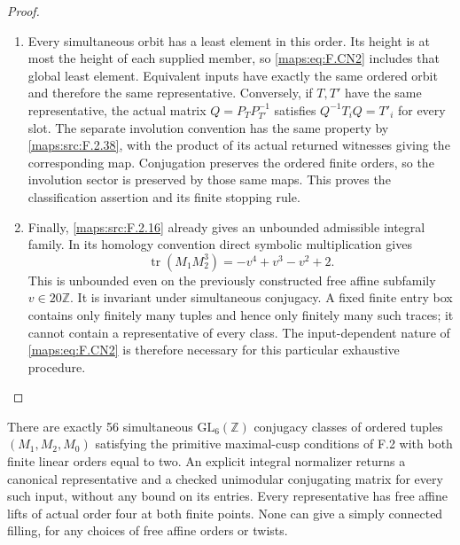 \begin{proof}
\begin{enumerate}[label=\arabic*.]
\item Every simultaneous orbit has a least element in this order.
Its height is at most the height of each supplied member, so
\eqref{maps:eq:F.CN2} includes that global least element.
Equivalent inputs have exactly the same ordered orbit and
therefore the same representative. Conversely, if $T,T'$ have
the same representative, the actual matrix
$Q=P_TP_{T'}^{-1}$ satisfies $Q^{-1}T_iQ=T'_i$ for every slot.
The separate involution convention has the same property by
\cref{maps:src:F.2.38}, with the product of its actual returned
witnesses giving the corresponding map. Conjugation preserves
the ordered finite orders, so the involution sector is preserved
by those same maps. This proves the classification assertion
and its finite stopping rule.

\item Finally, \ref{maps:src:F.2.16} already gives an unbounded admissible integral
family. In its homology convention direct symbolic
multiplication gives
\[
             \operatorname{tr}(M_1M_2^3)
                       =-v^4+v^3-v^2+2.                 \tag{F.CN3}\label{maps:eq:F.CN3}
\]
This is unbounded even on the previously constructed free
affine subfamily $v\in20\mathbb Z$. It is invariant under
simultaneous conjugacy. A fixed finite entry box contains
only finitely many tuples and hence only finitely many such
traces; it cannot contain a representative of every class.
The input-dependent nature of \eqref{maps:eq:F.CN2} is therefore necessary
for this particular exhaustive procedure.

\end{enumerate}
\end{proof}




\begin{theorem}\label{maps:src:F.2.38}


There are exactly 56 simultaneous $\mathrm{GL}_6(\mathbb Z)$
conjugacy classes of ordered tuples $(M_1,M_2,M_0)$ satisfying
the primitive maximal-cusp conditions of F.2 with both finite
linear orders equal to two.  An explicit integral normalizer
returns a canonical representative and a checked unimodular
conjugating matrix for every such input, without any bound on
its entries.  Every representative has free affine lifts of
actual order four at both finite points.  None can give a
simply connected filling, for any choices of free affine
orders or twists.

\end{theorem}


